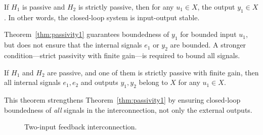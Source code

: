 \begin{theorem}\label{thm:passivity1}
If $H_1$ is passive and $H_2$ is strictly passive, then for any $u_1 \in X$, 
the output $y_1 \in X$.  
In other words, the closed-loop system is input-output stable.
\end{theorem}

\begin{remark}
Theorem~\ref{thm:passivity1} guarantees boundedness of $y_1$ for bounded input $u_1$, 
but does not ensure that the internal signals $e_1$ or $y_2$ are bounded.  
A stronger condition—strict passivity with finite gain—is required to bound all signals.
\end{remark}

\begin{theorem}\label{thm:passivity2}
If $H_1$ and $H_2$ are passive, and one of them is strictly passive with finite gain, 
then all internal signals $e_1, e_2$ and outputs $y_1, y_2$ belong to $X$ 
for any $u_1 \in X$.
\end{theorem}

\begin{remark}
This theorem strengthens Theorem~\ref{thm:passivity1} by ensuring closed-loop 
boundedness of \emph{all} signals in the interconnection, not only the external outputs.
\end{remark}

\begin{figure}[!ht]
\centering
{}%
\caption{Two-input feedback interconnection.}
\label{fig:feedback_two}
\end{figure}

